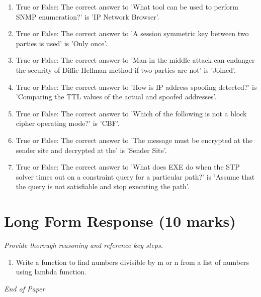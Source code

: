 \documentclass[12pt]{article}
\begin{document}
\begin{enumerate}[label=\arabic*.]
\item True or False: The correct answer to 'What tool can be used to perform SNMP enumeration?' is 'IP Network Browser'.
\item True or False: The correct answer to 'A session symmetric key between two parties is used' is 'Only once'.
\item True or False: The correct answer to 'Man in the middle attack can endanger the security of Diffie Hellman method if two parties are not' is 'Joined'.
\item True or False: The correct answer to 'How is IP address spoofing detected?' is 'Comparing the TTL values of the actual and spoofed addresses'.
\item True or False: The correct answer to 'Which of the following is not a block cipher operating mode?' is 'CBF'.
\item True or False: The correct answer to 'The message must be encrypted at the sender site and decrypted at the' is 'Sender Site'.
\item True or False: The correct answer to 'What does EXE do when the STP solver times out on a constraint query for a particular path?' is 'Assume that the query is not satisfiable and stop executing the path'.
\end{enumerate}

\section*{Long Form Response (10 marks)}
\textit{Provide thorough reasoning and reference key steps.}
\begin{enumerate}[label=\arabic*.]
\item Write a function to find numbers divisible by m or n from a list of numbers using lambda
function.
\end{enumerate}

\vfill
\noindent\textit{End of Paper}
\end{document}
